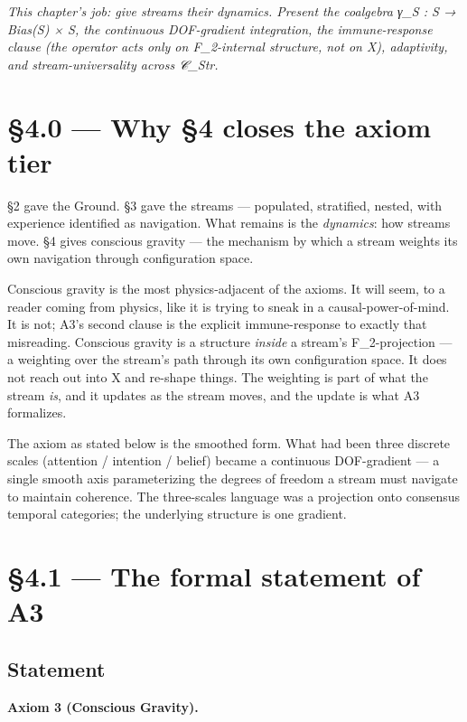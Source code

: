 \documentclass[11pt, openany]{book}
\newcommand{\sectionbreak}{\clearpage}
\begin{document}
\textit{This chapter's job: give streams their dynamics. Present the coalgebra γ\_\allowbreak{}S : S → Bias(S) × S, the continuous DOF-gradient integration, the immune-response clause (the operator acts only on F\_\allowbreak{}2-internal structure, not on X), adaptivity, and stream-universality across 𝒞\_\allowbreak{}Str.}

\sectionbreak

\section{§4.0 --- Why §4 closes the axiom tier}

§2 gave the Ground. §3 gave the streams --- populated, stratified, nested, with experience identified as navigation. What remains is the \textit{dynamics}: how streams move. §4 gives conscious gravity --- the mechanism by which a stream weights its own navigation through configuration space.

Conscious gravity is the most physics-adjacent of the axioms. It will seem, to a reader coming from physics, like it is trying to sneak in a causal-power-of-mind. It is not; A3's second clause is the explicit immune-response to exactly that misreading. Conscious gravity is a structure \textit{inside} a stream's F\_\allowbreak{}2-projection --- a weighting over the stream's path through its own configuration space. It does not reach out into X and re-shape things. The weighting is part of what the stream \textit{is}, and it updates as the stream moves, and the update is what A3 formalizes.

The axiom as stated below is the smoothed form. What had been three discrete scales (attention / intention / belief) became a continuous DOF-gradient --- a single smooth axis parameterizing the degrees of freedom a stream must navigate to maintain coherence. The three-scales language was a projection onto consensus temporal categories; the underlying structure is one gradient.

\sectionbreak

\section{§4.1 --- The formal statement of A3}

\subsection{Statement}

\textbf{Axiom 3 (Conscious Gravity).}
\end{document}
